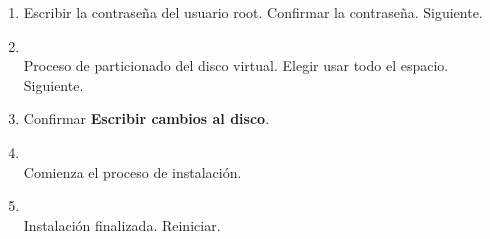 \documentclass[11pt]{article}
\begin{document}
\begin{enumerate}
			\item Escribir la contraseña del usuario root. Confirmar la contraseña. Siguiente.
			\item 
				\begin{minipage}[t]{\linewidth}
			          \raggedright
			          \medskip
			          \\Proceso de particionado del disco virtual. Elegir usar todo el espacio. Siguiente. 
			    \end{minipage}	

			\item Confirmar \textbf{Escribir cambios al disco}.

			\item 
				\begin{minipage}[t]{\linewidth}
			        \raggedright
			        \medskip
			        \\Comienza el proceso de instalación. 
		        \end{minipage}	

		    \item 
		    	\begin{minipage}[t]{\linewidth}
			        \raggedright
			        \medskip
			        \\Instalación finalizada. Reiniciar. 
		        \end{minipage}	


\end{enumerate}
\end{document}
